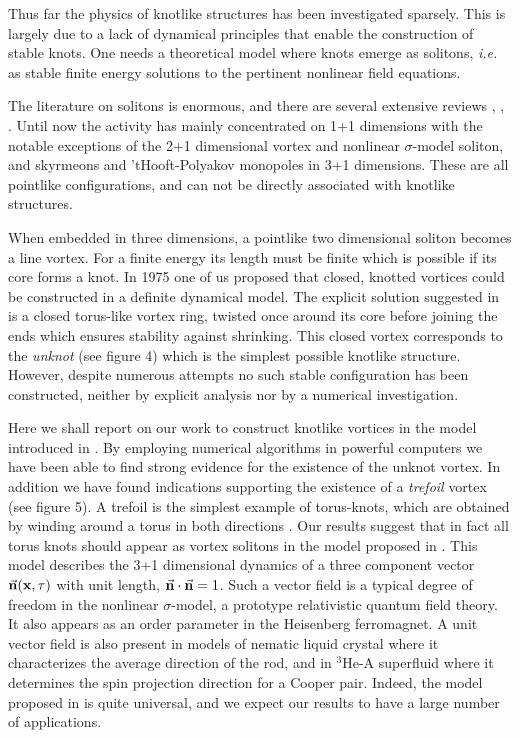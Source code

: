 Thus far the physics of knotlike structures 
has been investigated 
sparsely. This is largely
due to a lack of dynamical principles that enable 
the construction of stable knots. One 
needs a theoretical model where knots emerge
as solitons, {\it i.e.} as stable finite energy 
solutions to the pertinent nonlinear field equations.

The literature on solitons is enormous,
and there are several extensive reviews \cite{rebbi}, 
\cite{fadde1}, \cite{sany}. Until 
now the activity has mainly concentrated
on 1+1 dimensions with the notable exceptions of
the 2+1 dimensional vortex and nonlinear $\sigma$-model
soliton, 
and skyrmeons and 'tHooft-Polyakov monopoles in 3+1 dimensions.
These are all pointlike configurations, 
and can not be directly associated with knotlike structures.

When embedded in three dimensions, a pointlike 
two dimensional soliton becomes a line vortex.
For a finite energy its length must
be finite which is possible if its core 
forms a knot. In 1975  one of us \cite{fadde2} 
proposed that closed, knotted vortices could be
constructed in a definite dynamical model. 
The explicit solution suggested 
in \cite{fadde2} is a closed torus-like vortex
ring, twisted once around its core 
before joining the ends which ensures 
stability against shrinking. This closed
vortex corresponds to the {\it unknot} (see figure 4)
which is the simplest possible knotlike structure.
However, despite numerous attempts
no such stable configuration has been constructed, neither
by explicit analysis nor by a numerical investigation.

\vskip 0.3cm
Here we shall report on our
work to construct knotlike vortices in the
model introduced in \cite{fadde2}.
By employing numerical algorithms in
powerful computers we have been able
to find strong evidence for the existence
of the unknot vortex.
In addition we have found indications 
supporting the existence of a  {\it trefoil } vortex
(see figure 5).
A trefoil is the simplest example of 
torus-knots, which are obtained by winding around
a torus in both directions \cite{ati}.
Our results suggest that in fact all torus
knots should appear as vortex solitons in the 
model proposed in \cite{fadde2}. 
This model describes the 3+1 dimensional
dynamics of a three component vector
$\vec{\bf n}( {\bf
x},\tau) $ with unit length, $ \vec{\bf n} 
\cdot \vec { \bf n} = 1 $. 
Such a vector field is a typical degree of freedom
in the nonlinear $\sigma$-model, a prototype relativistic
quantum field theory. It also appears  
as an order parameter in 
the Heisenberg ferromagnet. A unit vector field is
also present in models of nematic liquid crystal
where it characterizes the average 
direction of the rod, and
in $^3$He-A superfluid where it 
determines the spin projection direction for a 
Cooper pair. Indeed, the model proposed
in \cite{fadde2} is quite universal, and we expect
our results to have a large number of 
applications.

